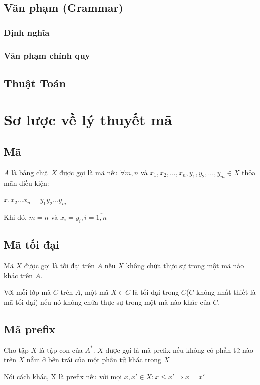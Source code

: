 \documentclass[14pt]{extreport}
\begin{document}
\section{Văn phạm (Grammar)}
\subsection{Định nghĩa}
\subsection{Văn phạm chính quy}

\section{Thuật Toán}

\chapter{Sơ lược về lý thuyết mã}
\section{Mã}
$A$ là bảng chữ. $X$ được gọi là mã nếu $\forall m,n$ và $x_1,x_2,...,x_n,y_1,y_2,...,y_m \in X$ thỏa mãn điều kiện:
\begin{center}
$x_1x_2...x_n=y_1y_2...y_m$
\end{center}
Khi đó, $m=n$ và $x_i=y_i,i=\overline{1,n}$
\section{Mã tối đại}
Mã $X$ được gọi là tối đại trên $A$ nếu $X$ không chứa thực sự trong một mã nào khác trên $A$.

Với mỗi lớp mã $C$ trên $A$, một mã $X\in C$ là tối đại trong $C$($C$ không nhất thiết là mã tối đại) nếu nó không chứa thực sự trong một mã nào khác của $C$.
\section{Mã prefix}
	Cho tập $X$ là tập con của $A^*$. $X$ được gọi là mã prefix nếu không có phần tử nào trên $X$ nằm ở bên trái của một phần tử khác trong $X$

Nói cách khác, X là prefix nếu với mọi $x,x' \in X: x\leq x' \Rightarrow x=x'$
\end{document}
